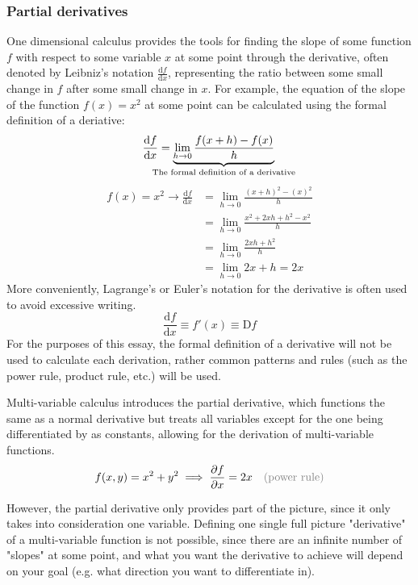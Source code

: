 \documentclass[a4paper, 12pt]{article} %
\newcommand{\justify}[1]{\text{\color{gray}(#1)}}
\newcommand{\der}[2]{\frac{\mathrm{d} #1}{\mathrm{d} #2}} %
\newcommand{\partialder}[2]{\frac{\partial #1}{\partial #2}} %
\begin{document}
\subsubsection{Partial derivatives}
One dimensional calculus provides the tools for finding the slope of some function $f$ with respect to some variable $x$ at some point through the derivative, often denoted by Leibniz's notation $\der{f}{x}$, representing the ratio between some small change in $f$ after some small change in $x$. For example, the equation of the slope of the function $f(x)=x^2$ at some point can be calculated using the formal definition of a deriative:
\begin{equation}
	\der{f}{x}=\underbrace{\lim_{h\rightarrow0}\frac{f(x+h)-f(x)}{h}}_\text{\hidewidth The formal definition of a derivative\hidewidth}\\
\end{equation}
\begin{align*}
	f(x)=x^2\rightarrow\der{f}{x}&=\lim_{h\rightarrow0}\frac{(x+h)^2-(x)^2}{h}\\
	&=\lim_{h\rightarrow0}\frac{x^2+2xh+h^2-x^2}{h}\\
	&=\lim_{h\rightarrow0}\frac{2xh+h^2}{h}\\
	&=\lim_{h\rightarrow0}2x+h=2x
\end{align*}
More conveniently, Lagrange's or Euler's notation for the derivative is often used to avoid excessive writing.
$$\der{f}{x}\equiv f'(x)\equiv \mathrm{D}f$$
For the purposes of this essay, the formal definition of a derivative will not be used to calculate each derivation, rather common patterns and rules (such as the power rule, product rule, etc.) will be used. 

Multi-variable calculus introduces the partial derivative, which functions the same as a normal derivative but treats all variables except for the one being differentiated by as constants, allowing for the derivation of multi-variable functions.
\begin{align*}
	f(x,y)=x^2+y^2\implies\partialder{f}{x}=2x && \justify{power rule}
\end{align*}

However, the partial derivative only provides part of the picture, since it only takes into consideration one variable. Defining one single full picture "derivative" of a multi-variable function is not possible, since there are an infinite number of "slopes" at some point, and what you want the derivative to achieve will depend on your goal (e.g. what direction you want to differentiate in).
\end{document}
